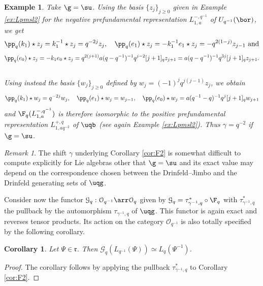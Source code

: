 \documentclass[11pt]{amsart}
\newtheorem{cor}[theorem]{Corollary}
\newtheorem{example}[theorem]{Example}
\theoremstyle{definition}
\theoremstyle{remark}
\newtheorem{rem}[theorem]{Remark}
\numberwithin{equation}{section}
\begin{document}
\begin{example}\label{ex:FqLp} Take $\g = \su$. Using the basis $\{z_j\}_{j\geq 0}$ given in Example \ref{ex:Lpmsl2} for the negative prefundamental representation $L_{1,a}^{-,q^{-1}}$ of $U_{q^{-1}}(\bor)$, we get
$$\pp_q(k_1)\star z_j = k_1^{-1}\star z_j = q^{-2j}z_j, \quad \pp_q(e_1)\star z_j = -k_1^{-1}e_1\star z_j= -q^{2(1-j)}z_{j-1} \text{ and}
$$
$$\pp_q(e_0)\star z_j = -k_1e_0\star z_j = q^{2(j+1)}a(q-q^{-1})^{-1}q^{j-2}[j+1]_qz_{j+1} = a(q-q^{-1})^{-1}q^{3j}[j+1]_qz_{j+1}.$$\\[-2.5mm]
Using instead the basis $\{w_j\}_{j\geq 0}$ defined by $w_j = (-1)^j q^{j(j-1)}z_j$, we obtain
$$ \pp_q(k_1)\star w_j = q^{-2j}w_j, \quad \pp_q(e_1)\star w_j = w_{j-1}, \quad \pp_q(e_0)\star w_j = a(q^{-1}-q)^{-1}q^{j}[j+1]_qw_{j+1}$$
and $\F_q(L_{1,a}^{-,q^{-1}})$ is therefore isomorphic to the positive prefundamental representation $L_{1,a q^{-2}}^{+,q}$ of $\uqb$ (see again Example \ref{ex:Lpmsl2}). Thus $\gamma = q^{-2}$ if $\g = \su$. 
\end{example}
\begin{rem} The shift $\gamma$ underlying Corollary \ref{cor:F2} is somewhat difficult to compute explicitly for Lie algebras other that $\g=\su$ and its exact value may depend on the correspondence chosen between the Drinfeld--Jimbo and the Drinfeld generating sets of $\uqg$.
\end{rem}
Consider now the functor $\mathcal{G}_q:\mathcal{O}_{q^{-1}}\arr \mathcal{O}_q$ given by $\mathcal{G}_q = \tau_{\gamma^{-1},q}^*\circ \F_q$
with $\tau_{\gamma^{-1},q}^*$ the pullback by the automorphism $\tau_{\gamma^{-1},q}$ of $\uqg$. This functor is again exact and reverses tensor products. Its action on the category $\mathcal{O}_{q^{-1}}$ is also totally specified by the following corollary.
\begin{cor}\label{cor:F} Let $\Psi \in \mathfrak{r}$. Then $\mathcal{G}_q(L_{q^{-1}}(\Psi))\simeq L_q(\Psi^{-1})$.
\end{cor}
\begin{proof}
The corollary follows by applying the pullback $\tau_{\gamma^{-1},q}^*$ to Corollary \ref{cor:F2}.
\end{proof}
\end{document}
